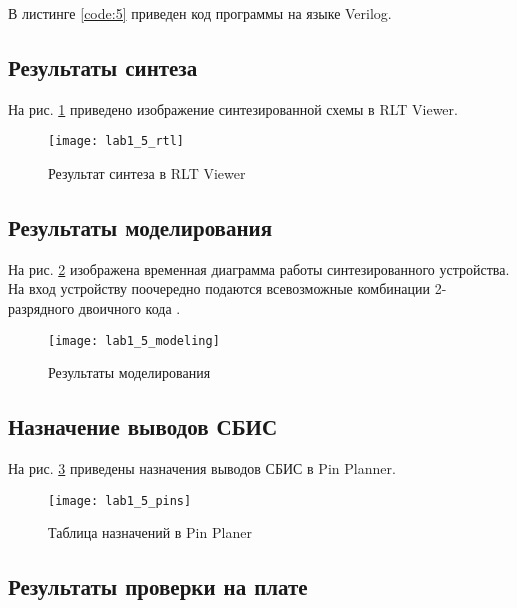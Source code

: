 В листинге \ref{code:5} приведен код программы на языке Verilog.



\subsection{Результаты синтеза}

На рис. \ref{fig:lab1_5_rtl} приведено изображение синтезированной схемы в RLT Viewer.

\begin{figure}[H]
\begin{center}
	\texttt{[image: lab1\_5\_rtl]}
	\caption{Результат синтеза в RLT Viewer}
	\label{fig:lab1_5_rtl}
\end{center}
\end{figure}

\subsection{Результаты моделирования}
\label{sec:lab1_5_modeling}

На рис. \ref{fig:lab1_5_modeling} изображена временная диаграмма работы синтезированного устройства. На вход устройству поочередно подаются всевозможные комбинации 2-разрядного двоичного кода .
\begin{figure}[H]
\begin{center}
	\texttt{[image: lab1\_5\_modeling]}
	\caption{Результаты моделирования}
	\label{fig:lab1_5_modeling}
\end{center}
\end{figure}

\subsection{Назначение выводов СБИС}

На рис. \ref{fig:lab1_5_pins} приведены назначения выводов СБИС в Pin Planner.

\begin{figure}[H]
\begin{center}
	\texttt{[image: lab1\_5\_pins]}
	\caption{Таблица назначений в Pin Planer}
	\label{fig:lab1_5_pins}
\end{center}
\end{figure}

\subsection{Результаты проверки на плате}

